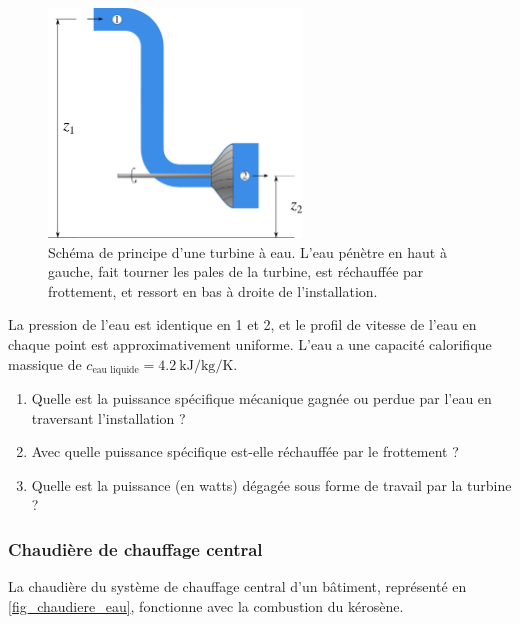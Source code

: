 	\begin{figure}
		\begin{center}
			\includegraphics[width=0.6\textwidth]{images/turbine_eau.png}
		\end{center}
		\caption{Schéma de principe d’une turbine à eau. L’eau pénètre en haut à gauche, fait tourner les pales de la turbine, est réchauffée par frottement, et ressort en bas à droite de l’installation.}
		\label{fig_turbine_hydraulique_exo}
	\end{figure}
	
	La pression de l’eau est identique en 1 et 2, et le profil de vitesse de l’eau en chaque point est approximativement uniforme. L’eau a une capacité calorifique massique de $c_{\text{eau liquide}} = \SI{4,2}{\kilo\joule\per\kilogram\per\kelvin}$.
	
	\begin{enumerate}
		\item Quelle est la puissance spécifique mécanique gagnée ou perdue par l’eau en traversant l’installation ?
		\item Avec quelle puissance spécifique est-elle réchauffée par le frottement ?
		\item Quelle est la puissance (en \si{watts}) dégagée sous forme de travail par la turbine ?
	\end{enumerate}


\subsubsection{Chaudière de chauffage central}
\label{exo_chaudiere_simple}

	La chaudière du système de chauffage central d’un bâtiment, représenté en \cref{fig_chaudiere_eau}, fonctionne avec la combustion du kérosène.

